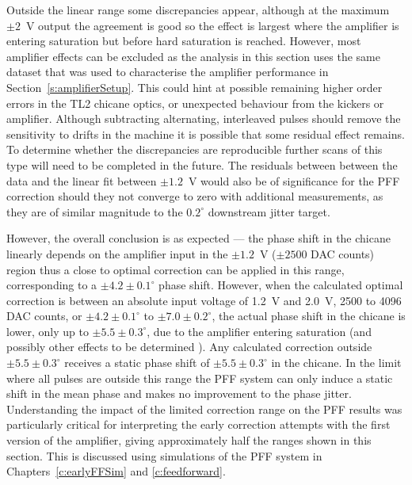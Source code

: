 Outside the linear range some discrepancies appear, although at the maximum \(\pm2\)~V output the agreement is good so the effect is largest where the amplifier is entering saturation but before hard saturation is reached. However, most amplifier effects can be excluded as the analysis in this section uses the same dataset that was used to characterise the amplifier performance in Section~\ref{s:amplifierSetup}. This could hint at possible remaining higher order errors in the TL2 chicane optics, or unexpected behaviour from the kickers or amplifier. Although subtracting alternating, interleaved pulses should remove the sensitivity to drifts in the machine it is possible that some residual effect remains. To determine whether the discrepancies are reproducible further scans of this type will need to be completed in the future. The residuals between between the data and the linear fit between \(\pm1.2\)~V would also be of significance for the PFF correction should they not converge to zero with additional measurements, as they are of similar magnitude to the \(0.2^\circ\) downstream jitter target. 

However, the overall conclusion is as expected --- the phase shift in the chicane linearly depends on the amplifier input in the \(\pm1.2\)~V (\(\pm2500\) DAC counts) region thus a close to optimal correction can be applied in this range, corresponding to a \(\pm4.2\pm0.1^\circ\) phase shift. However, when the calculated optimal correction is between an absolute input voltage of 1.2~V and 2.0~V, 2500 to 4096 DAC counts, or \(\pm4.2\pm0.1^\circ\) to \(\pm7.0\pm0.2^\circ\), the actual phase shift in the chicane is lower, only up to \(\pm5.5\pm0.3^\circ\), due to the amplifier entering saturation (and possibly other effects to be determined ). Any calculated correction outside \(\pm5.5\pm0.3^\circ\) receives a static phase shift of \(\pm5.5\pm0.3^\circ\) in the chicane. In the limit where all pulses are outside this range the PFF system can only induce a static shift in the mean phase and makes no improvement to the phase jitter. Understanding the impact of the limited correction range on the PFF results was particularly critical for interpreting the early correction attempts with the first version of the amplifier, giving approximately half the ranges shown in this section. This is discussed using simulations of the PFF system in Chapters~\ref{c:earlyFFSim} and \ref{c:feedforward}.

